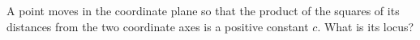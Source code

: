 A point moves in the coordinate plane so that the product of the squares of its distances from the two coordinate axes is a positive constant $c$. What is its locus?
